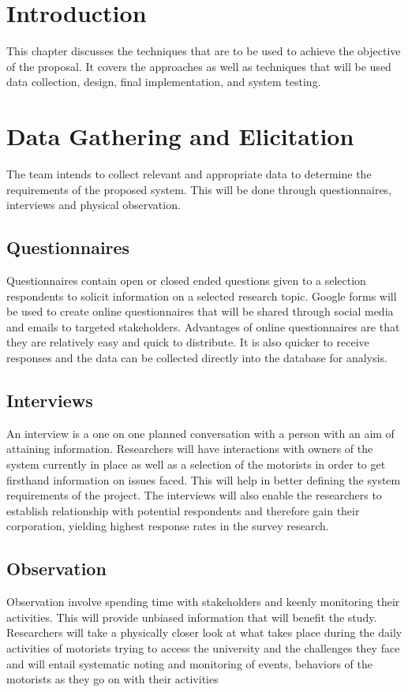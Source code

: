 \section{Introduction}
This chapter discusses the techniques that are to be used to achieve the objective of the proposal. It covers the approaches as well as techniques that will be used data collection, design, final implementation, and system testing.


\section{Data Gathering and Elicitation}
The team intends to collect relevant and appropriate data to determine the requirements of the proposed system. This will be done through questionnaires, interviews and physical observation\cite{kothari_research_2004}.

\subsection{Questionnaires}
Questionnaires contain open or closed ended questions given to a selection respondents to solicit information on a selected research topic\cite{bartram_using_2019}. Google forms will be used to create online questionnaires that will be shared through social media and emails to targeted stakeholders. Advantages of online questionnaires are that they are relatively easy and quick to distribute. It is also quicker to receive responses and the data can be collected directly into the database for analysis.

\subsection{Interviews}
An interview is a one on one planned conversation with a person with an aim of attaining information. Researchers will have interactions with owners of the system currently in place as well as a selection of the motorists in order to get firsthand information on issues faced. This will help in better defining the system requirements of the project. The interviews will also enable the researchers to establish relationship with potential respondents and therefore gain their corporation,  yielding highest response rates in the survey research.

\subsection{Observation}
Observation involve spending time with stakeholders and keenly monitoring their activities. This will provide unbiased information that will benefit the study. Researchers will take a physically closer look at what takes place during the daily activities of motorists trying to access the university and the challenges they face and will entail systematic noting and monitoring of events, behaviors of the motorists as they go on with their activities


